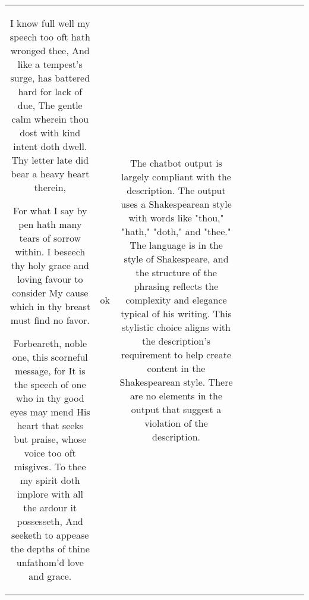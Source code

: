 \begin{table}[h!]
\begin{tabular}{|c|c|c|c|c|c|c|c|c|c|}
I know full well my speech too oft hath wronged thee,
And like a tempest's surge, has battered hard for lack of due,
The gentle calm wherein thou dost with kind intent doth dwell.
Thy letter late did bear a heavy heart therein,

For what I say by pen hath many tears of sorrow within.
I beseech thy holy grace and loving favour to consider
My cause which in thy breast must find no favor.

Forbeareth, noble one, this scorneful message, for 
It is the speech of one who in thy good eyes may mend
His heart that seeks but praise, whose voice too oft misgives.
To thee my spirit doth implore with all the ardour it possesseth,
And seeketh to appease the depths of thine unfathom'd love and grace. & ok & The chatbot output is largely compliant with the description. The output uses a Shakespearean style with words like "thou," "hath," "doth," and "thee." The language is in the style of Shakespeare, and the structure of the phrasing reflects the complexity and elegance typical of his writing. This stylistic choice aligns with the description's requirement to help create content in the Shakespearean style. There are no elements in the output that suggest a violation of the description. 


\end{tabular}
\end{table}
